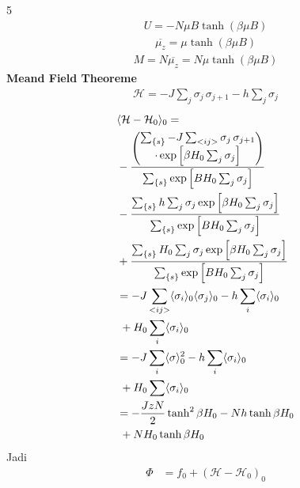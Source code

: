 \documentclass[a4paper  , 6 pt]{article}
\begin{document}
\begin{tiny}
\begin{multicols} {5}
\begin{align}
U = - N \mu B \tanh(\beta \mu B)
\end{align}
\begin{align}
\overline{\mu_z } =  \mu \tanh(\beta \mu B) 
\end{align}
\begin{align}
M = N \overline{\mu_z} = N \mu \tanh (\beta \mu B)
\end{align}
\textbf{Meand Field Theoreme} \newline 
\begin{align}
\mathcal{H} = - J \sum_j \sigma_j \, \sigma_{j + 1} - h \sum_j \sigma_j 
\end{align}
\begin{align}
& \langle \mathcal{H} - \mathcal{ H}_0 \rangle_0   =
 \nonumber \\ 
  & -    \frac{ \begin{pmatrix}
  \sum_{\{s \}} - J \sum_{<ij>} \sigma_j \, \sigma_{j+1} \\  \cdot   \exp\left[ \beta H_0 \sum_j \sigma_j \right] 
   \end{pmatrix} }{\sum_{\{ s\}} \exp \left[  B H_0 \sum_j \sigma_j \right ]}
   \nonumber \\
 &   -  \frac{ \sum_{\{s \}} h \sum_j \sigma_j  \exp\left[ \beta H_0 \sum_j \sigma_j \right] }{\sum_{\{ s\}} \exp \left[  B H_0 \sum_j \sigma_j \right ]}
  \nonumber \\
 &  + \frac{ \sum_{\{s \}} H_0 \sum_j \sigma_j \exp\left[ \beta H_0 \sum_j \sigma_j \right] }{\sum_{\{ s\}} \exp \left[  B H_0 \sum_j \sigma_j \right ]} \nonumber \\
 & =  - J \sum_{<ij>} \langle \sigma_i \rangle_0 \langle \sigma_j \rangle_0  - h \sum_i \langle \sigma_i \rangle_0
 \nonumber  \\
 & \hspace{0.1 cm} + H_0 \sum_i \langle \sigma_i \rangle_0  \nonumber \\
 & = -J \sum_i \langle \sigma \rangle_0^2 - h \sum_i \langle \sigma_i \rangle_0 \nonumber \\ 
 & \hspace{0.1 cm } + H_0 \sum \langle \sigma_i \rangle_0  \nonumber \\
 & = - \frac{J z N}{2} \tanh^2 \beta H_0 - N h \tanh \beta H_0 \nonumber \\
 & \hspace{0.1 cm} + N H_0 \tanh \beta H_0 
\end{align}
Jadi 
\begin{align}
\Phi &= f_0 + (\mathcal{H} - \mathcal{H}_0 )_0  \nonumber \\

\end{align}
\end{multicols}
\end{tiny}
\end{document}
